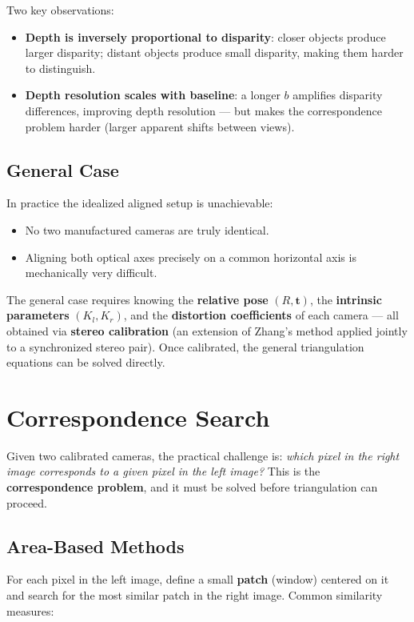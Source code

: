 \documentclass[11pt,a4paper]{article}
\theoremstyle{definition}
\theoremstyle{plain}
\theoremstyle{remark}
\newcommand{\p}[1]{\mathbf{#1}}             %
\begin{document}
Two key observations:
\begin{itemize}
    \item \textbf{Depth is inversely proportional to disparity}: closer objects produce larger disparity; distant objects produce small disparity, making them harder to distinguish.
    \item \textbf{Depth resolution scales with baseline}: a longer $b$ amplifies disparity differences, improving depth resolution — but makes the correspondence problem harder (larger apparent shifts between views).
\end{itemize}

\subsection{General Case}

In practice the idealized aligned setup is unachievable:
\begin{itemize}
    \item No two manufactured cameras are truly identical.
    \item Aligning both optical axes precisely on a common horizontal axis is mechanically very difficult.
\end{itemize}

The general case requires knowing the \textbf{relative pose} $(R, \p{t})$, the \textbf{intrinsic parameters} $(K_l, K_r)$, and the \textbf{distortion coefficients} of each camera — all obtained via \textbf{stereo calibration} (an extension of Zhang's method applied jointly to a synchronized stereo pair). Once calibrated, the general triangulation equations can be solved directly.

\section{Correspondence Search}

Given two calibrated cameras, the practical challenge is: \textit{which pixel in the right image corresponds to a given pixel in the left image?} This is the \textbf{correspondence problem}, and it must be solved before triangulation can proceed.

\subsection{Area-Based Methods}

For each pixel in the left image, define a small \textbf{patch} (window) centered on it and search for the most similar patch in the right image. Common similarity measures:
\end{document}
